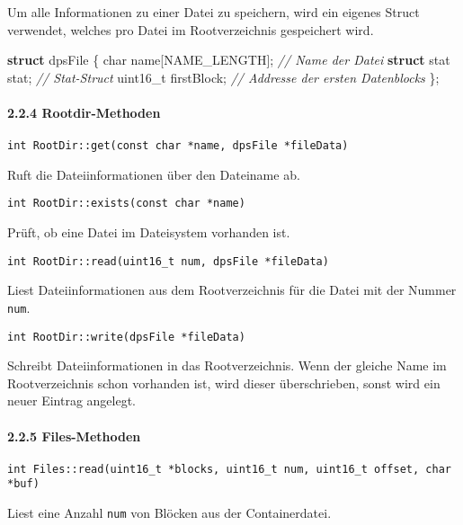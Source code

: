 \documentclass[]{article}
\newenvironment{Shaded}{}{}
\newcommand{\CommentTok}[1]{\textcolor[rgb]{0.38,0.63,0.69}{\textit{#1}}}
\newcommand{\DataTypeTok}[1]{\textcolor[rgb]{0.56,0.13,0.00}{#1}}
\newcommand{\KeywordTok}[1]{\textcolor[rgb]{0.00,0.44,0.13}{\textbf{#1}}}
\newcommand{\NormalTok}[1]{#1}
\let\oldparagraph\paragraph
\renewcommand{\paragraph}[1]{\oldparagraph{#1}\mbox{}}
\begin{document}
Um alle Informationen zu einer Datei zu speichern, wird ein eigenes
Struct verwendet, welches pro Datei im Rootverzeichnis gespeichert wird.

\begin{Shaded}
  \begin{framed}
\begin{Highlighting}[]
\KeywordTok{struct}\NormalTok{ dpsFile \{}
    \DataTypeTok{char}\NormalTok{ name[NAME_LENGTH]; }\CommentTok{// Name der Datei}
    \KeywordTok{struct}\NormalTok{ stat stat;       }\CommentTok{// Stat-Struct}
    \DataTypeTok{uint16_t}\NormalTok{ firstBlock;    }\CommentTok{// Addresse der ersten Datenblocks}
\NormalTok{\};}
\end{Highlighting}
\end{framed}
\end{Shaded}

\hypertarget{rootdir-methoden}{%
\paragraph{2.2.4 Rootdir-Methoden}\label{rootdir-methoden}}

\texttt{int\ RootDir::get(const\ char\ *name,\ dpsFile\ *fileData)}

Ruft die Dateiinformationen über den Dateiname ab.

\texttt{int\ RootDir::exists(const\ char\ *name)}

Prüft, ob eine Datei im Dateisystem vorhanden ist.

\texttt{int\ RootDir::read(uint16\_t\ num,\ dpsFile\ *fileData)}

Liest Dateiinformationen aus dem Rootverzeichnis für die Datei mit der
Nummer \texttt{num}.

\texttt{int\ RootDir::write(dpsFile\ *fileData)}

Schreibt Dateiinformationen in das Rootverzeichnis. Wenn der gleiche
Name im Rootverzeichnis schon vorhanden ist, wird dieser überschrieben,
sonst wird ein neuer Eintrag angelegt.

\hypertarget{files-methoden}{%
\paragraph{2.2.5 Files-Methoden}\label{files-methoden}}

\texttt{int\ Files::read(uint16\_t\ *blocks,\ uint16\_t\ num,\ uint16\_t\ offset,\ char\ *buf)}

Liest eine Anzahl \texttt{num} von Blöcken aus der Containerdatei.
\end{document}
